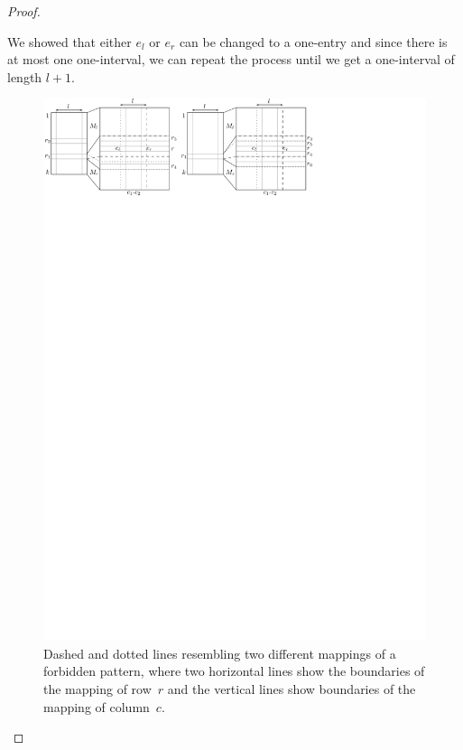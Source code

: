 \begin{proof}
\begin{itemize}
\begin{itemize}
	\end{itemize}
\end{itemize}
We showed that either $e_l$ or $e_r$ can be changed to a one-entry and since there is at most one one-interval, we can repeat the process until we get a one-interval of length $l+1$.

\begin{figure}[!ht]
\centering
\includegraphics[width=\textwidth]{img/emptymid.pdf}
\caption{Dashed and dotted lines resembling two different mappings of a forbidden pattern, where two horizontal lines show the boundaries of the mapping of row~$r$ and the vertical lines show boundaries of the mapping of column~$c$.}
\label{fig:emptymid}
\end{figure}
\end{proof}

